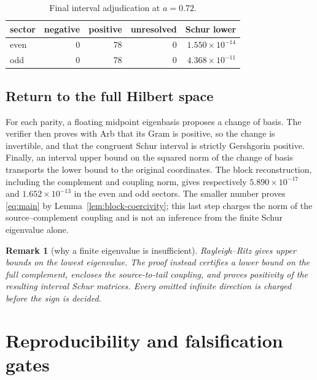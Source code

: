 \documentclass[10pt]{article}
\newtheorem{remark}[theorem]{Remark}
\begin{document}
\begin{table}[H]
\centering
\caption{Final interval adjudication at $a=0.72$.}
\label{tab:certificate}
\begin{tabular}{@{}lrrrr@{}}
\toprule
sector & negative & positive & unresolved & Schur lower\\
\midrule
even & 0 & 78 & 0 & $1.550\times10^{-14}$\\
odd  & 0 & 78 & 0 & $4.368\times10^{-11}$\\
\bottomrule
\end{tabular}
\end{table}

\subsection{Return to the full Hilbert space}

For each parity, a floating midpoint eigenbasis proposes a change of basis.
The verifier then proves with Arb that its Gram is positive, so the change is
invertible, and that the congruent Schur interval is strictly Gershgorin
positive.  Finally, an interval upper bound on the squared norm of the change
of basis transports the lower bound to the original coordinates.  The block
reconstruction, including the complement and coupling norm, gives respectively
$5.890\times10^{-17}$ and
$1.652\times10^{-13}$ in the even and odd sectors.  The smaller
number proves \eqref{eq:main} by Lemma~\ref{lem:block-coercivity}; this last step
charges the norm of the source--complement coupling and is not an inference
from the finite Schur eigenvalue alone.

\begin{remark}[why a finite eigenvalue is insufficient]
Rayleigh--Ritz gives upper bounds on the lowest eigenvalue.  The proof instead
certifies a lower bound on the full complement, encloses the source-to-tail
coupling, and proves positivity of the resulting interval Schur matrices.
Every omitted infinite direction is charged before the sign is decided.
\end{remark}

\section{Reproducibility and falsification gates}
\end{document}
